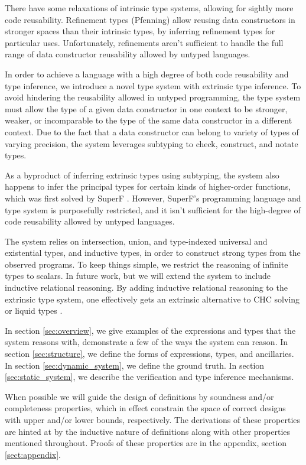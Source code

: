 \documentclass[acmsmall]{acmart}
\theoremstyle{definition}
\begin{document}
There have some relaxations of intrinsic type systems, allowing for sightly more code reusability.
Refinement types (Pfenning) \cite{} allow reusing data constructors in stronger spaces than their intrinsic types, by
inferring refinement types for particular uses.
Unfortunately, refinements aren't sufficient to handle the full range of data constructor reusability allowed by untyped languages.

In order to achieve a language with a high degree of both code reusability and type inference, 
we introduce a novel type system with extrinsic type inference. 
To avoid hindering the reusability allowed in untyped programming, 
the type system must allow the type of a given data constructor in one context
to be stronger, weaker, or incomparable to the type of 
the same data constructor in a different context. 
Due to the fact that a data constructor can belong to variety of types of varying precision,
the system leverages subtyping to check, construct, and notate types.

As a byproduct of inferring extrinsic types using subtyping, the system also happens to infer the principal types for 
certain kinds of higher-order functions, which was first solved by SuperF \cite{}. 
However, SuperF's programming language and type system is purposefully 
restricted, and it isn't sufficient for the high-degree of code reusability allowed by untyped languages.

The system relies on intersection, union, and type-indexed universal and existential types, and inductive types, in order 
to construct strong types from the observed programs. 
To keep things simple, we restrict the reasoning of infinite types to scalars. In future work, 
but we will extend the system to include inductive relational reasoning. By adding inductive relational
reasoning to the extrinsic type system, one effectively gets an extrinsic alternative to CHC solving \cite{} 
or liquid types \cite{}.


In section \ref{sec:overview}, we give examples of the expressions and types that the system reasons with,
demonstrate a few of the ways the system can reason. 
In section \ref{sec:structure}, we define the forms of expressions, types, and ancillaries. 
In section \ref{sec:dynamic_system}, we define the ground truth.
In section \ref{sec:static_system}, we describe the verification and type inference mechanisms.

When possible we will guide the design of definitions by soundness and/or completeness properties,
which in effect constrain the space of correct designs with upper and/or lower bounds, respectively. 
The derivations of these properties are hinted at by the inductive nature of definitions 
along with other properties mentioned throughout.
Proofs  of these properties are in the appendix, section \ref{sect:appendix}.
\end{document}
